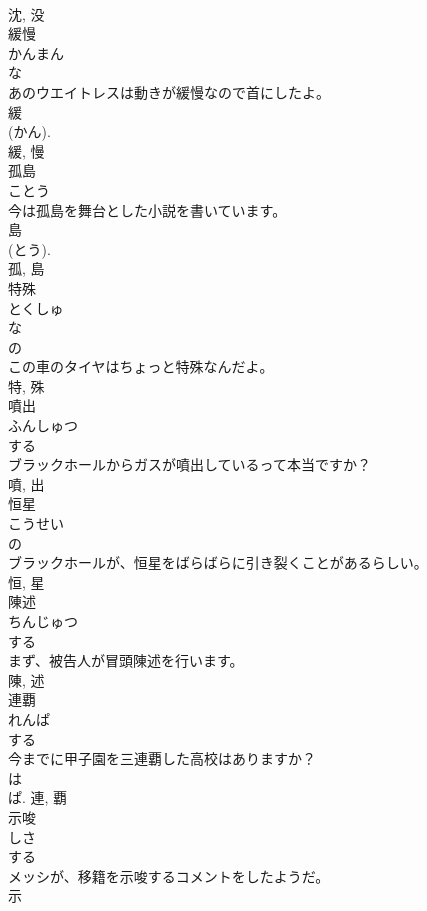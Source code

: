 \documentclass[8pt]{extreport}
\begin{document}
\begin{CJK}{UTF8}{min}
\\	沈, 没	
\\	緩慢	
\\	かんまん	
\\	な 
\\	あのウエイトレスは動きが緩慢なので首にしたよ。	
\\	緩 
\\	(かん). 
\\	緩, 慢	
\\	孤島	
\\	ことう	
\\	今は孤島を舞台とした小説を書いています。	
\\	島 
\\	(とう). 
\\	孤, 島	
\\	特殊	
\\	とくしゅ	
\\	な 
\\	の 
\\	この車のタイヤはちょっと特殊なんだよ。	
\\	特, 殊	
\\	噴出	
\\	ふんしゅつ	
\\	する 
\\	ブラックホールからガスが噴出しているって本当ですか？	
\\	噴, 出	
\\	恒星	
\\	こうせい	
\\	の 
\\	ブラックホールが、恒星をばらばらに引き裂くことがあるらしい。	
\\	恒, 星	
\\	陳述	
\\	ちんじゅつ	
\\	する 
\\	まず、被告人が冒頭陳述を行います。	
\\	陳, 述	
\\	連覇	
\\	れんぱ	
\\	する 
\\	今までに甲子園を三連覇した高校はありますか？	
\\	は 
\\	ぱ.	連, 覇	
\\	示唆	
\\	しさ	
\\	する 
\\	メッシが、移籍を示唆するコメントをしたようだ。	
\\	示 

\end{CJK}
\end{document}
